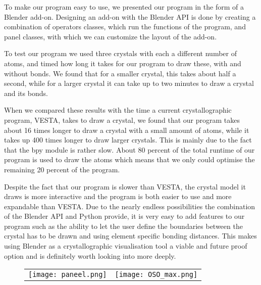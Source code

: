 \par
To make our program easy to use, we presented our program in the form of a Blender add-on. Designing an add-on with the Blender API is done by creating a combination of operators classes, which run the functions of the program, and panel classes, with which we can customize the layout of the add-on. 
\par
To test our program we used three crystals with each a different number of atoms, and timed how long it takes for our program to draw these, with and without bonds. We found that for a smaller crystal, this takes about half a second, while for a larger crystal it can take up to two minutes to draw a crystal and its bonds. 
\par
When we compared these results with the time a current crystallographic program, VESTA, takes to draw a crystal, we found that our program takes about 16 times longer to draw a crystal with a small amount of atoms, while it takes up 400 times longer to draw larger crystals. This is mainly due to the fact that the bpy module is rather slow. About 80 percent of the total runtime of our program is used to draw the atoms which means that we only could optimise the remaining 20 percent of the program.
\par
Despite the fact that our program is slower than VESTA, the crystal model it draws is more interactive and the program is both easier to use and more expandable than VESTA. Due to the nearly endless possibilities the combination of the Blender API and Python provide, it is very easy to add features to our program such as the ability to let the user define the boundaries between the crystal has to be drawn and using element specific bonding distances. This makes using Blender as a crystallographic visualisation tool a viable and future proof option and is definitely worth looking into more deeply. 

\begin{figure}[H]
\begin{center}
\begin{tabular}{ll}

\texttt{[image: paneel.png]}
&
\texttt{[image: OSO\_max.png]}

\end{tabular}
\end{center}
\end{figure}